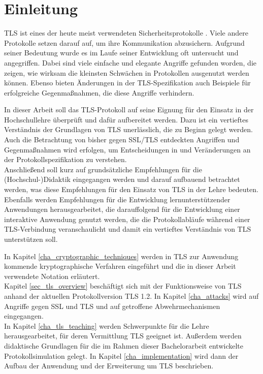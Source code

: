 \chapter{Einleitung}


TLS ist eines der heute meist verwendeten Sicherheitsprotokolle \cite{schmeh09}. Viele andere Protokolle setzen darauf auf, um ihre Kommunikation abzusichern. Aufgrund seiner Bedeutung wurde es im Laufe seiner Entwicklung oft untersucht und angegriffen. Dabei sind viele einfache und elegante Angriffe gefunden worden, die zeigen, wie wirksam die kleinsten Schwächen in Protokollen ausgenutzt werden können. Ebenso bieten Änderungen in der TLS-Spezifikation auch Beispiele für erfolgreiche Gegenmaßnahmen, die diese Angriffe verhindern.


In dieser Arbeit soll das TLS-Protokoll auf seine Eignung für den Einsatz in der Hochschullehre überprüft und dafür aufbereitet werden. Dazu ist ein vertieftes Verständnis der Grundlagen von TLS unerlässlich, die zu Beginn gelegt werden. Auch die Betrachtung von bisher gegen SSL/TLS entdeckten Angriffen und Gegenmaßnahmen wird  erfolgen, um Entscheidungen in und Veränderungen an der Protokollspezifikation zu verstehen. \\
Anschließend soll kurz auf grundsätzliche Empfehlungen für die (Hochschul-)Didaktik eingegangen werden und darauf aufbauend betrachtet werden, was diese Empfehlungen für den Einsatz von TLS in der Lehre bedeuten. Ebenfalls werden Empfehlungen für die Entwicklung lernunterstützender Anwendungen herausgearbeitet, die darauffolgend für die Entwicklung einer interaktive Anwendung genutzt werden, die die Protokollabläufe während einer TLS-Verbindung veranschaulicht und damit ein vertieftes Verständnis von TLS unterstützen soll.

In Kapitel \ref{cha_cryptographic_techniques} werden in TLS zur Anwendung kommende kryptographische Verfahren eingeführt und die in dieser Arbeit verwendete Notation erläutert. \\
Kapitel \ref{sec_tls_overview} beschäftigt sich mit der Funktionsweise von TLS anhand der aktuellen Protokollversion TLS 1.2. In Kapitel \ref{cha_attacks} wird auf Angriffe gegen SSL und TLS und auf getroffene Abwehrmechanismen eingegangen.\\
In Kapitel \ref{cha_tls_teaching} werden Schwerpunkte für die Lehre herausgearbeitet, für deren Vermittlung TLS geeignet ist. Außerdem werden didaktische Grundlagen für die im Rahmen dieser Bachelorarbeit entwickelte Protokollsimulation gelegt. In Kapitel \ref{cha_implementation} wird dann der Aufbau der Anwendung und der Erweiterung um TLS beschrieben.

